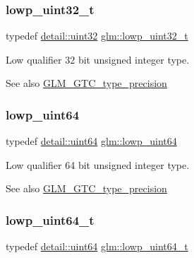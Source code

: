 \subsubsection{\texorpdfstring{lowp\+\_\+uint32\+\_\+t}{lowp\_uint32\_t}}
{\footnotesize\ttfamily typedef \hyperlink{namespaceglm_1_1detail_ade6cfbf377022aaa391af8cd50489222}{detail\+::uint32} \hyperlink{group__gtc__type__precision_ga9f8cb602a358e1f48bda2682cf051f0c}{glm\+::lowp\+\_\+uint32\+\_\+t}}

Low qualifier 32 bit unsigned integer type. \begin{DoxySeeAlso}{See also}
\hyperlink{group__gtc__type__precision}{G\+L\+M\+\_\+\+G\+T\+C\+\_\+type\+\_\+precision} 
\end{DoxySeeAlso}
\mbox{\label{group__gtc__type__precision_gacf666a9d9b309c4615c7a4f2ab0be289}} 
\subsubsection{\texorpdfstring{lowp\+\_\+uint64}{lowp\_uint64}}
{\footnotesize\ttfamily typedef \hyperlink{namespaceglm_1_1detail_adec4b19bf4982125e122db2fe03c5810}{detail\+::uint64} \hyperlink{group__gtc__type__precision_gacf666a9d9b309c4615c7a4f2ab0be289}{glm\+::lowp\+\_\+uint64}}

Low qualifier 64 bit unsigned integer type. \begin{DoxySeeAlso}{See also}
\hyperlink{group__gtc__type__precision}{G\+L\+M\+\_\+\+G\+T\+C\+\_\+type\+\_\+precision} 
\end{DoxySeeAlso}
\mbox{\label{group__gtc__type__precision_gabf3069d4f188557a87b1d7f35eb0a270}} 
\subsubsection{\texorpdfstring{lowp\+\_\+uint64\+\_\+t}{lowp\_uint64\_t}}
{\footnotesize\ttfamily typedef \hyperlink{namespaceglm_1_1detail_adec4b19bf4982125e122db2fe03c5810}{detail\+::uint64} \hyperlink{group__gtc__type__precision_gabf3069d4f188557a87b1d7f35eb0a270}{glm\+::lowp\+\_\+uint64\+\_\+t}}

